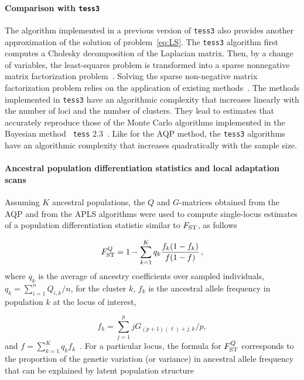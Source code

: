\paragraph{Comparison with {\tt tess3}} The algorithm implemented in a previous
version of {\tt tess3} also provides another approximation of the solution of
problem~\eqref{eq:LS}. The {\tt tess3} algorithm first computes a Cholesky
decomposition of the Laplacian matrix. Then, by a change of variables, the
least-squares problem is transformed into a sparse nonnegative matrix
factorization problem~\citep{Caye2016}. Solving the sparse non-negative matrix
factorization problem relies on the application of existing
methods~\citep{Kim2011, Frichot2014}. The methods implemented in {\tt tess3}
have an algorithmic complexity that increases linearly with the number of loci
and the number of clusters. They lead to estimates that accurately reproduce
those of the Monte Carlo algorithms implemented in the Bayesian method {\tt
  tess} 2.3~\citep{Caye2016}. Like for the AQP method, the {\tt tess3}
algorithms have an algorithmic complexity that increases quadratically with the
sample size.




\paragraph{Ancestral population differentiation statistics and local adaptation
  scans} Assuming $K$ ancestral populations, the $Q$ and $G$-matrices obtained
from the AQP and from the APLS algorithms were used to compute single-locus
estimates of a population differentiation statistic similar to $F_{\rm
  ST}$, as follows

$$
F^{Q}_{\rm ST} = 1 - \sum_{k=1}^K  q_k \frac{f_k (1-f_k)}{f(1-f)} \, ,
$$
\noindent where $q_k$ is the average of ancestry coefficients over sampled
individuals, $q_k = \sum_{i =1}^n Q_{i,k}/n$, for the cluster $k$, $f_k$ is the
ancestral allele frequency in population $k$ at the locus of interest,

$$
f_k =  \sum_{j = 1}^p  j G_{(p+1)(\ell) + j, k}/p ,
$$
and $f = \sum_{k = 1}^K q_k f_k$~\citep{Martins2016}.
For a particular locus, the formula for $F^Q_{\rm ST}$ corresponds to the
proportion of the genetic variation (or variance) in ancestral allele frequency
that can be explained by latent population structure

